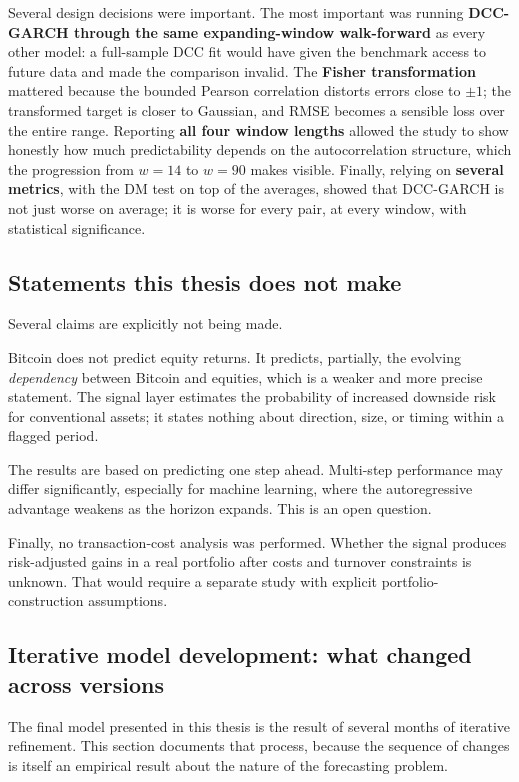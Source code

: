 Several design decisions were important. The most important was running \textbf{DCC-GARCH through the same expanding-window walk-forward} as every other model: a full-sample DCC fit would have given the benchmark access to future data and made the comparison invalid. The \textbf{Fisher transformation} mattered because the bounded Pearson correlation distorts errors close to $\pm 1$; the transformed target is closer to Gaussian, and RMSE becomes a sensible loss over the entire range. Reporting \textbf{all four window lengths} allowed the study to show honestly how much predictability depends on the autocorrelation structure, which the progression from $w=14$ to $w=90$ makes visible. Finally, relying on \textbf{several metrics}, with the DM test on top of the averages, showed that DCC-GARCH is not just worse on average; it is worse for every pair, at every window, with statistical significance.

\subsection{Statements this thesis does not make}

Several claims are explicitly not being made.

Bitcoin does not predict equity returns. It predicts, partially, the evolving \emph{dependency} between Bitcoin and equities, which is a weaker and more precise statement. The signal layer estimates the probability of increased downside risk for conventional assets; it states nothing about direction, size, or timing within a flagged period.

The results are based on predicting one step ahead. Multi-step performance may differ significantly, especially for machine learning, where the autoregressive advantage weakens as the horizon expands. This is an open question.

Finally, no transaction-cost analysis was performed. Whether the signal produces risk-adjusted gains in a real portfolio after costs and turnover constraints is unknown. That would require a separate study with explicit portfolio-construction assumptions.

\subsection{Iterative model development: what changed across versions}
\label{subsec:iterations}

The final model presented in this thesis is the result of several months of iterative refinement.
This section documents that process, because the sequence of changes is itself an
empirical result about the nature of the forecasting problem.


